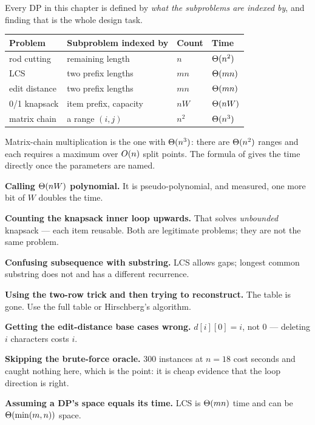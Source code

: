 \begin{conceptbox}
Every DP in this chapter is defined by \emph{what the subproblems are indexed
by}, and finding that is the whole design task.

\begin{longtable}{@{}L{3.4cm}L{4.2cm}L{3.0cm}L{3.4cm}@{}}
\toprule
{}
\textbf{Problem} & \textbf{Subproblem indexed by} & \textbf{Count} &
\textbf{Time} \\
\midrule
\endhead
rod cutting & remaining length & $n$ & $\Theta(n^{2})$ \\
LCS & two prefix lengths & $mn$ & $\Theta(mn)$ \\
edit distance & two prefix lengths & $mn$ & $\Theta(mn)$ \\
0/1 knapsack & item prefix, capacity & $nW$ & $\Theta(nW)$ \\
matrix chain & a range $(i,j)$ & $n^{2}$ & $\Theta(n^{3})$ \\
\bottomrule
\end{longtable}

\smallskip
Matrix-chain multiplication is the one with $\Theta(n^{3})$: there are
$\Theta(n^{2})$ ranges and each requires a maximum over $O(n)$ split
points. The formula of  gives the time directly once the
parameters are named.
\end{conceptbox}

\begin{pitfall}
\begin{tight}
  \item \textbf{Calling $\Theta(nW)$ polynomial.} It is pseudo-polynomial, and
        measured, one more bit of $W$ doubles the time.
  \item \textbf{Counting the knapsack inner loop upwards.} That solves
        \emph{unbounded} knapsack --- each item reusable. Both are legitimate
        problems; they are not the same problem.
  \item \textbf{Confusing subsequence with substring.} LCS allows gaps; longest
        common substring does not and has a different recurrence.
  \item \textbf{Using the two-row trick and then trying to reconstruct.} The
        table is gone. Use the full table or Hirschberg's algorithm.
  \item \textbf{Getting the edit-distance base cases wrong.} $d[i][0] = i$,
        not 0 --- deleting $i$ characters costs $i$.
  \item \textbf{Skipping the brute-force oracle.} 300 instances at $n = 18$
        cost seconds and caught nothing here, which is the point: it is cheap
        evidence that the loop direction is right.
  \item \textbf{Assuming a DP's space equals its time.} LCS is $\Theta(mn)$
        time and can be $\Theta(\min(m,n))$ space.
\end{tight}
\end{pitfall}

